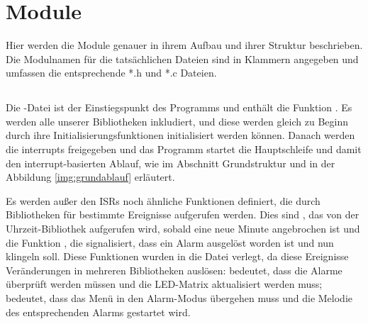 \section{Module}
Hier werden die Module genauer in ihrem Aufbau und ihrer Struktur beschrieben. Die Modulnamen für die tatsächlichen Dateien sind in Klammern angegeben und umfassen die entsprechende *.h und *.c Dateien.

\subsection{}
Die -Datei ist der Einstiegspunkt des Programms und enthält die Funktion . Es werden alle unserer Bibliotheken inkludiert, und diese werden gleich zu Beginn durch ihre Initialisierungsfunktionen initialisiert werden können. Danach werden die interrupts freigegeben und das Programm startet die Hauptschleife und damit den interrupt-basierten Ablauf, wie im Abschnitt Grundstruktur und in der Abbildung \ref{img:grundablauf} erläutert.
\newline


Es werden außer den ISRs noch ähnliche Funktionen definiert, die durch Bibliotheken für bestimmte Ereignisse aufgerufen werden. Dies sind , das von der Uhrzeit-Bibliothek aufgerufen wird, sobald eine neue Minute angebrochen ist und die Funktion , die signalisiert, dass ein Alarm ausgelöst worden ist und nun klingeln soll. Diese Funktionen wurden in die  Datei verlegt, da diese Ereignisse Veränderungen in mehreren Bibliotheken auslösen:  bedeutet, dass die Alarme überprüft werden müssen und die LED-Matrix aktualisiert werden muss;
 bedeutet, dass das Menü in den Alarm-Modus übergehen muss und die Melodie des entsprechenden Alarms gestartet wird.

